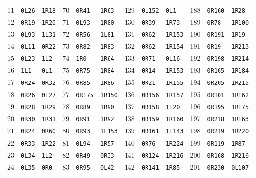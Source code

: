 \begin{longtable}{rllrllrllrll}
11 & \texttt{0L26} & \texttt{1R18} & 70 & \texttt{0R41} & \texttt{1R63} & 129 & \texttt{0L152} & \texttt{0L1} & 188 & \texttt{0R160} & \texttt{1R28}\\
12 & \texttt{0R19} & \texttt{1R20} & 71 & \texttt{0L93} & \texttt{1R80} & 130 & \texttt{0R39} & \texttt{1R73} & 189 & \texttt{0R78} & \texttt{1R100}\\
13 & \texttt{0L93} & \texttt{1L31} & 72 & \texttt{0R56} & \texttt{1L81} & 131 & \texttt{0R62} & \texttt{1R153} & 190 & \texttt{0R191} & \texttt{1R19}\\
14 & \texttt{0L11} & \texttt{0R22} & 73 & \texttt{0R82} & \texttt{1R83} & 132 & \texttt{0R62} & \texttt{1R154} & 191 & \texttt{0R19} & \texttt{1R213}\\
15 & \texttt{0L23} & \texttt{1L2} & 74 & \texttt{1R0} & \texttt{1R64} & 133 & \texttt{0R71} & \texttt{0L16} & 192 & \texttt{0R198} & \texttt{1R214}\\
16 & \texttt{1L1} & \texttt{0L1} & 75 & \texttt{0R75} & \texttt{1R84} & 134 & \texttt{0R14} & \texttt{1R153} & 193 & \texttt{0R165} & \texttt{1R184}\\
17 & \texttt{0R24} & \texttt{0R32} & 76 & \texttt{0R85} & \texttt{1R86} & 135 & \texttt{0R21} & \texttt{1R155} & 194 & \texttt{0R205} & \texttt{1R215}\\
18 & \texttt{0R26} & \texttt{0L27} & 77 & \texttt{0R175} & \texttt{1R150} & 136 & \texttt{0R156} & \texttt{1R157} & 195 & \texttt{0R101} & \texttt{1R162}\\
19 & \texttt{0R28} & \texttt{1R29} & 78 & \texttt{0R89} & \texttt{1R90} & 137 & \texttt{0R158} & \texttt{1L20} & 196 & \texttt{0R195} & \texttt{1R175}\\
20 & \texttt{0R30} & \texttt{1R31} & 79 & \texttt{0R91} & \texttt{1R92} & 138 & \texttt{0R159} & \texttt{1R160} & 197 & \texttt{0R218} & \texttt{1R163}\\
21 & \texttt{0R24} & \texttt{0R60} & 80 & \texttt{0R93} & \texttt{1L153} & 139 & \texttt{0R161} & \texttt{1L143} & 198 & \texttt{0R219} & \texttt{1R220}\\
22 & \texttt{0R33} & \texttt{1R22} & 81 & \texttt{0L94} & \texttt{1R57} & 140 & \texttt{0R76} & \texttt{1R224} & 199 & \texttt{0R119} & \texttt{1R87}\\
23 & \texttt{0L34} & \texttt{1L2} & 82 & \texttt{0R49} & \texttt{0R33} & 141 & \texttt{0R124} & \texttt{1R216} & 200 & \texttt{0R168} & \texttt{1R216}\\
24 & \texttt{0L35} & \texttt{0R0} & 83 & \texttt{0R95} & \texttt{0L42} & 142 & \texttt{0R141} & \texttt{1R85} & 201 & \texttt{0R230} & \texttt{0L107}\\

\end{longtable}
